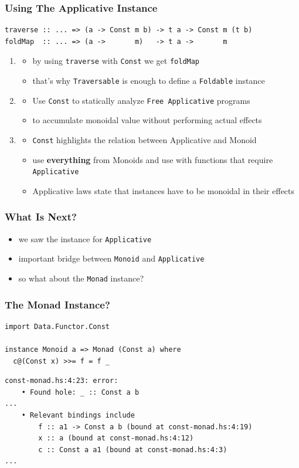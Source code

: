 \documentclass[aspectratio=169]{beamer}
\begin{document}
\begin{frame}[fragile,t]
  \frametitle{Using The Applicative Instance}
  \begin{verbatim}
traverse :: ... => (a -> Const m b) -> t a -> Const m (t b)
foldMap  :: ... => (a ->       m)   -> t a ->       m
  \end{verbatim}
\vfill
  \begin{enumerate}
  \item
    \begin{itemize}
    \item by using \texttt{traverse} with \texttt{Const} we get \texttt{foldMap}
    \item that's why \texttt{Traversable} is enough to define a \texttt{Foldable} instance
    \end{itemize}
  \item<2->
    \begin{itemize}
    \item Use \texttt{Const} to statically analyze \texttt{Free Applicative} programs
    \item to accumulate monoidal value without performing actual effects
    \end{itemize}
  \item<3->
    \begin{itemize}
    \item \texttt{Const} highlights the relation between
      Applicative and Monoid
    \item use \textbf{everything} from Monoids and use with functions that require \texttt{Applicative}
    \item Applicative laws state that instances have to be monoidal in their effects
    \end{itemize}
  \end{enumerate}
\end{frame}

\begin{frame}[fragile]
  \frametitle{What Is Next?}
  \begin{itemize}
  \item we saw the instance for \texttt{Applicative}
  \item important bridge between \texttt{Monoid} and \texttt{Applicative}
  \item so what about the \texttt{Monad} instance?
  \end{itemize}
\end{frame}

\begin{frame}[fragile]
  \frametitle{The Monad Instance?}
  \begin{verbatim}
import Data.Functor.Const

instance Monoid a => Monad (Const a) where
  c@(Const x) >>= f = f _
  \end{verbatim}
  \begin{verbatim}
const-monad.hs:4:23: error:
    • Found hole: _ :: Const a b
...
    • Relevant bindings include
        f :: a1 -> Const a b (bound at const-monad.hs:4:19)
        x :: a (bound at const-monad.hs:4:12)
        c :: Const a a1 (bound at const-monad.hs:4:3)
...
  \end{verbatim}
\end{frame}
\end{document}
